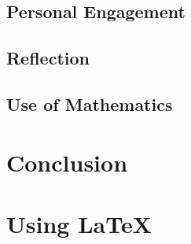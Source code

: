 \documentclass[UTF8, 11pt]{ctexart}
\begin{document}
    \subsection{Personal Engagement}

    \subsection{Reflection}

    \subsection{Use of Mathematics}

\section{Conclusion}

\section{Using \LaTeX\ }
\end{document}
